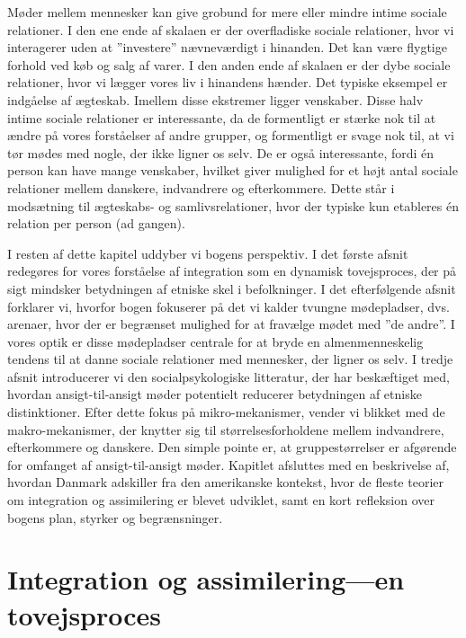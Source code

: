\documentclass[
]{book}
\begin{document}
Møder mellem mennesker kan give grobund for mere eller mindre intime sociale relationer. I den ene ende af skalaen er der overfladiske sociale relationer, hvor vi interagerer uden at ''investere'' nævneværdigt i hinanden. Det kan være flygtige forhold ved køb og salg af varer. I den anden ende af skalaen er der dybe sociale relationer, hvor vi lægger vores liv i hinandens hænder. Det typiske eksempel er indgåelse af ægteskab. Imellem disse ekstremer ligger venskaber. Disse halv intime sociale relationer er interessante, da de formentligt er stærke nok til at ændre på vores forståelser af andre grupper, og formentligt er svage nok til, at vi tør mødes med nogle, der ikke ligner os selv. De er også interessante, fordi én person kan have mange venskaber, hvilket giver mulighed for et højt antal sociale relationer mellem danskere, indvandrere og efterkommere. Dette står i modsætning til ægteskabs- og samlivsrelationer, hvor der typiske kun etableres én relation per person (ad gangen).

I resten af dette kapitel uddyber vi bogens perspektiv. I det første afsnit redegøres for vores forståelse af integration som en dynamisk tovejsproces, der på sigt mindsker betydningen af etniske skel i befolkninger. I det efterfølgende afsnit forklarer vi, hvorfor bogen fokuserer på det vi kalder tvungne mødepladser, dvs. arenaer, hvor der er begrænset mulighed for at fravælge mødet med ''de andre''. I vores optik er disse mødepladser centrale for at bryde en almenmenneskelig tendens til at danne sociale relationer med mennesker, der ligner os selv. I tredje afsnit introducerer vi den socialpsykologiske litteratur, der har beskæftiget med, hvordan ansigt-til-ansigt møder potentielt reducerer betydningen af etniske distinktioner. Efter dette fokus på mikro-mekanismer, vender vi blikket med de makro-mekanismer, der knytter sig til størrelsesforholdene mellem indvandrere, efterkommere og danskere. Den simple pointe er, at gruppestørrelser er afgørende for omfanget af ansigt-til-ansigt møder. Kapitlet afsluttes med en beskrivelse af, hvordan Danmark adskiller fra den amerikanske kontekst, hvor de fleste teorier om integration og assimilering er blevet udviklet, samt en kort refleksion over bogens plan, styrker og begrænsninger.

\section{Integration og assimilering---en tovejsproces}\label{integration-og-assimileringen-tovejsproces}
\end{document}
